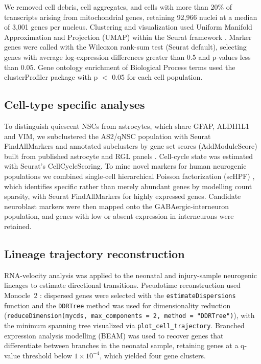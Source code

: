 \documentclass[11pt]{article}
\begin{document}
We removed cell debris, cell aggregates, and cells with more than 20\% of
transcripts arising from mitochondrial genes, retaining 92{,}966 nuclei at a
median of 3{,}001 genes per nucleus. Clustering and visualization used
Uniform Manifold Approximation and Projection (UMAP) within the Seurat
framework \cite{butler2018integrating}. Marker genes were called with the
Wilcoxon rank-sum test (Seurat default), selecting genes with average log-expression
differences greater than 0.5 and p-values less than 0.05. Gene ontology
enrichment of Biological Process terms used the clusterProfiler package
with p $<$ 0.05 for each cell population.

\subsection{Cell-type specific analyses}

To distinguish quiescent NSCs from astrocytes, which share GFAP, ALDH1L1 and
VIM, we subclustered the AS2/qNSC population with Seurat FindAllMarkers and
annotated subclusters by gene set scores (AddModuleScore) built from published
astrocyte and RGL panels \cite{zamanian2012genomic,liddelow2017neurotoxic,clarke2018normal,hochgerner2018conserved,zhong2020decoding,franjic2022transcriptomic}.
Cell-cycle state was estimated with Seurat's CellCycleScoring.
To mine novel markers for human neurogenic populations we combined
single-cell hierarchical Poisson factorization (scHPF)
\cite{levitin2019gene}, which identifies specific rather than merely abundant
genes by modelling count sparsity, with Seurat FindAllMarkers for highly
expressed genes. Candidate neuroblast markers were then mapped onto the
GABAergic-interneuron population, and genes with low or absent expression
in interneurons were retained.

\subsection{Lineage trajectory reconstruction}

RNA-velocity analysis \cite{lamanno2018rna} was applied to the neonatal and
injury-sample neurogenic lineages to estimate directional transitions.
Pseudotime reconstruction used Monocle~2 \cite{trapnell2014dynamics}: dispersed
genes were selected with the \texttt{estimateDispersions} function and the
\texttt{DDRTree} method was used for dimensionality reduction
(\texttt{reduceDimension(mycds, max\_components = 2, method = "DDRTree")}),
with the minimum spanning tree visualized via \texttt{plot\_cell\_trajectory}.
Branched expression analysis modelling (BEAM) was used to recover genes that
differentiate between branches in the neonatal sample, retaining genes at a
q-value threshold below $1\times 10^{-4}$, which yielded four gene clusters.
\end{document}
